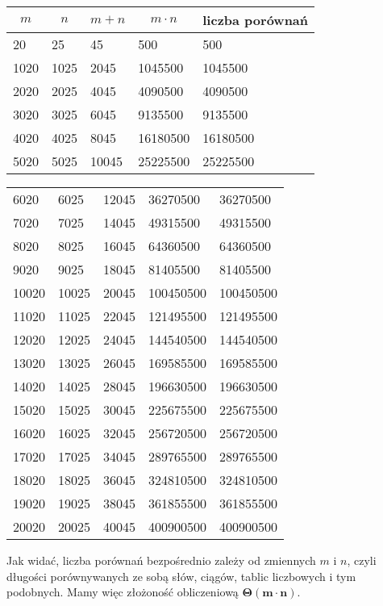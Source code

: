 \documentclass[a4paper,11pt]{article}
\begin{document}
  \begin{table}[ht]
  \centering
  \begin{tabular}{p{1.5cm}p{1.5cm}p{1.5cm}p{2cm}p{3cm}}
    \multicolumn{1}{c}{$m$} & \multicolumn{1}{c}{$n$} & \multicolumn{1}{c}{$m+n$} & \multicolumn{1}{c}{$m\cdot n$} & liczba porównań\\ \hline
    20 & 25 & 45 & 500 & 500\\
    1020 & 1025 & 2045 & 1045500 & 1045500\\
    2020 & 2025 & 4045 & 4090500 & 4090500\\
    3020 & 3025 & 6045 & 9135500 & 9135500\\
    4020 & 4025 & 8045 & 16180500 &16180500\\
    5020 & 5025 & 10045 & 25225500 & 25225500\\
  \end{tabular}
  \end{table}
  \begin{table}[ht]
  \centering
  \begin{tabular}{p{1.5cm}p{1.5cm}p{1.5cm}p{2cm}p{3cm}}
    6020 & 6025 & 12045 & 36270500 & 36270500\\
    7020 & 7025 & 14045 & 49315500 & 49315500\\
    8020 & 8025 & 16045 & 64360500 & 64360500\\
    9020 & 9025 & 18045 & 81405500 & 81405500\\
    10020 & 10025 & 20045 & 100450500 & 100450500\\
    11020 & 11025 & 22045 & 121495500 & 121495500\\
    12020 & 12025 & 24045 & 144540500 & 144540500\\
    13020 & 13025 & 26045 & 169585500 & 169585500\\
    14020 & 14025 & 28045 & 196630500 & 196630500\\
    15020 & 15025 & 30045 & 225675500 & 225675500\\
    16020 & 16025 & 32045 & 256720500 & 256720500\\
    17020 & 17025 & 34045 & 289765500 & 289765500\\
    18020 & 18025 & 36045 & 324810500 & 324810500\\
    19020 & 19025 & 38045 & 361855500 & 361855500\\
    20020 & 20025 & 40045 & 400900500 & 400900500\\
  \end{tabular}
  \end{table}
  Jak widać, liczba porównań bezpośrednio zależy od zmiennych $m$ i $n$, czyli długości porównywanych ze sobą słów, ciągów, tablic liczbowych i tym podobnych. Mamy więc złożoność obliczeniową $\boldsymbol{\Theta(m\cdot n)}$.
\end{document}
